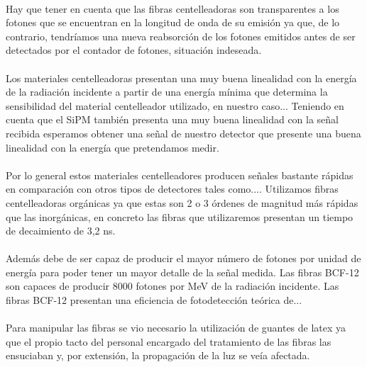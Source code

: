 \paragraph {}
Hay que tener en cuenta que las fibras centelleadoras son transparentes a los fotones que se encuentran en la longitud de onda de su emisión ya que, de lo contrario, tendríamos una nueva reabsorción de los fotones emitidos antes de ser detectados por el contador de fotones, situación indeseada.

\paragraph {}
Los materiales centelleadoras presentan una muy buena linealidad con la energía de la radiación incidente a partir de una energía mínima que determina la sensibilidad del material centelleador utilizado, en nuestro caso... Teniendo en cuenta que el SiPM también presenta una muy buena linealidad con la señal recibida esperamos obtener una señal de nuestro detector que presente una buena linealidad con la energía que pretendamos medir.

\paragraph {}
Por lo general estos materiales centelleadores producen señales bastante rápidas en comparación con otros tipos de detectores tales como.... Utilizamos fibras centelleadoras orgánicas ya que estas son 2 o 3 órdenes de magnitud más rápidas que las inorgánicas,  en concreto las fibras que utilizaremos presentan un tiempo de decaimiento de 3,2 ns. 

\paragraph {}
Además debe de ser capaz de producir el mayor número de fotones por unidad de energía para poder tener un mayor detalle de la señal medida. Las fibras BCF-12 son capaces de producir 8000 fotones por MeV de la radiación incidente. Las fibras BCF-12 presentan una eficiencia de fotodetección teórica de...

\paragraph {}
Para manipular las fibras se vio necesario la utilización de guantes de latex ya que el propio tacto  del personal encargado del tratamiento de las fibras las ensuciaban y, por extensión, la propagación de la luz se veía afectada.

